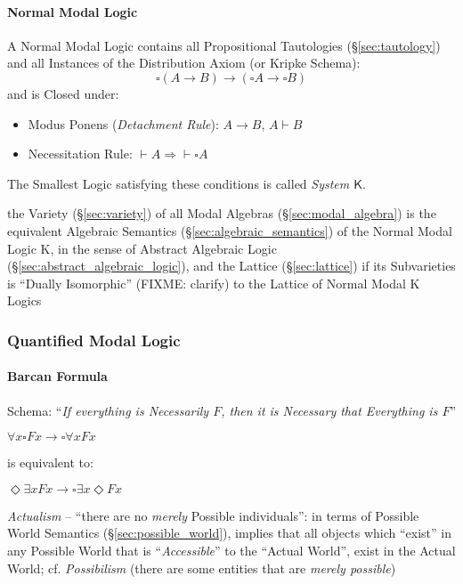 \paragraph{Normal Modal Logic}\label{sec:normal_modal}\hfill

A Normal Modal Logic contains all Propositional Tautologies
(\S\ref{sec:tautology}) and all Instances of the Distribution Axiom
(or Kripke Schema):
\[
  \square (A \rightarrow B) \rightarrow
  (\square A \rightarrow \square B)
\]
and is Closed under:
\begin{itemize}
  \item Modus Ponens (\emph{Detachment Rule}): $A \rightarrow B$, $A
    \vdash B$
  \item Necessitation Rule: $\vdash A \Rightarrow \vdash \square A$
\end{itemize}
The Smallest Logic satisfying these conditions is called \emph{System
  $\mathsf{K}$}.

the Variety (\S\ref{sec:variety}) of all Modal Algebras
(\S\ref{sec:modal_algebra}) is the equivalent Algebraic Semantics
(\S\ref{sec:algebraic_semantics}) of the Normal Modal Logic $\mathrm{K}$, in the
sense of Abstract Algebraic Logic (\S\ref{sec:abstract_algebraic_logic}), and
the Lattice (\S\ref{sec:lattice}) if its Subvarieties is ``Dually Isomorphic''
(FIXME: clarify) to the Lattice of Normal Modal $\mathrm{K}$ Logics



\subsubsection{Quantified Modal Logic}\label{sec:quantified_modal}

\paragraph{Barcan Formula}\label{sec:barcan_formula}\hfill

Schema: ``\emph{If everything is Necessarily $F$, then it is Necessary that
  Everything is $F$}''

$\forall x \square Fx \rightarrow \square \forall x Fx$

is equivalent to:

$\Diamond \exists x Fx \rightarrow \square \exists x \Diamond Fx$

\emph{Actualism} -- ``there are no \emph{merely} Possible individuals'': in
terms of Possible World Semantics (\S\ref{sec:possible_world}), implies that all
objects which ``exist'' in any Possible World that is ``\emph{Accessible}'' to
the ``Actual World'', exist in the Actual World; cf. \emph{Possibilism} (there
are some entities that are \emph{merely possible})



